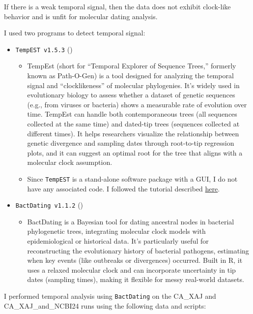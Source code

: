 \documentclass[
]{book}
\providecommand{\tightlist}{%
  \setlength{\itemsep}{0pt}\setlength{\parskip}{0pt}}
\begin{document}
If there is a weak temporal signal, then the data does not exhibit clock-like behavior and is unfit for molecular dating analysis.

I used two programs to detect temporal signal:

\begin{itemize}
\tightlist
\item
  \texttt{TempEST\ v1.5.3} (\citet{Rambaut2016})

  \begin{itemize}
  \item
    TempEst (short for ``Temporal Explorer of Sequence Trees,'' formerly known as Path-O-Gen) is a tool designed for analyzing the temporal signal and ``clocklikeness'' of molecular phylogenies. It's widely used in evolutionary biology to assess whether a dataset of genetic sequences (e.g., from viruses or bacteria) shows a measurable rate of evolution over time. TempEst can handle both contemporaneous trees (all sequences collected at the same time) and dated-tip trees (sequences collected at different times). It helps researchers visualize the relationship between genetic divergence and sampling dates through root-to-tip regression plots, and it can suggest an optimal root for the tree that aligns with a molecular clock assumption.
  \item
    Since \texttt{TempEST} is a stand-alone software package with a GUI, I do not have any associated code. I followed the tutorial described \href{https://beast.community/tempest_tutorial}{here}.
  \end{itemize}
\item
  \texttt{BactDating\ v1.1.2} (\citet{didelot2018})

  \begin{itemize}
  \tightlist
  \item
    BactDating is a Bayesian tool for dating ancestral nodes in bacterial phylogenetic trees, integrating molecular clock models with epidemiological or historical data. It's particularly useful for reconstructing the evolutionary history of bacterial pathogens, estimating when key events (like outbreaks or divergences) occurred. Built in R, it uses a relaxed molecular clock and can incorporate uncertainty in tip dates (sampling times), making it flexible for messy real-world datasets.
  \end{itemize}
\end{itemize}

I performed temporal analysis using \texttt{BactDating} on the CA\_XAJ and CA\_XAJ\_and\_NCBI24 runs using the following data and scripts:
\end{document}
